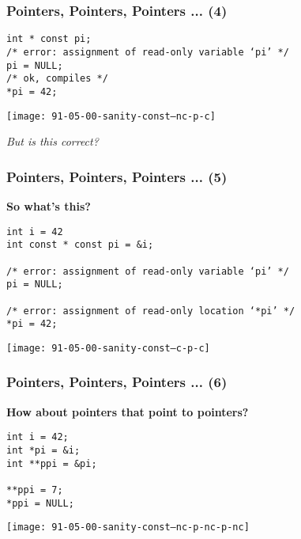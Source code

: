 \begin{frame}[fragile]
  \frametitle{Pointers, Pointers, Pointers ... (4)}

  \begin{block}{}
\begin{verbatim}
int * const pi;
/* error: assignment of read-only variable ‘pi’ */
pi = NULL;
/* ok, compiles */
*pi = 42;
\end{verbatim}
  \end{block}

  \begin{block}{}
    \texttt{[image: 91-05-00-sanity-const--nc-p-c]}
  \end{block}

  \textit{But is this correct?}

\end{frame}

\begin{frame}[fragile]
  \frametitle{Pointers, Pointers, Pointers ... (5)}

  \textbf{So what's this?}

  \begin{block}{}
\begin{verbatim}
int i = 42
int const * const pi = &i;

/* error: assignment of read-only variable ‘pi’ */
pi = NULL;

/* error: assignment of read-only location ‘*pi’ */
*pi = 42;
\end{verbatim}
  \end{block}

  \begin{block}{}
    \texttt{[image: 91-05-00-sanity-const--c-p-c]}
  \end{block}

\end{frame}

\begin{frame}[fragile]
  \frametitle{Pointers, Pointers, Pointers ... (6)}

  \textbf{How about pointers that point to pointers?}

  \begin{block}{}
\begin{verbatim}
int i = 42;
int *pi = &i;
int **ppi = &pi;

**ppi = 7;
*ppi = NULL;
\end{verbatim}
  \end{block}

  \begin{block}{}
    \texttt{[image: 91-05-00-sanity-const--nc-p-nc-p-nc]}
  \end{block}

\end{frame}


